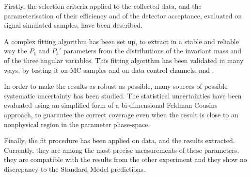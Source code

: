 Firstly, the selection criteria applied to the collected data, and the parameterisation of their efficiency and of the detector acceptance, evaluated on signal simulated samples, have been described.

A complex fitting algorithm has been set up, to extract in a stable and reliable way the $P_1$ and $P_5'$ parameters from the distributions of the \PKp\Pgpm\Pgmp\Pgmm invariant mass and of the three angular variables.
This fitting algorithm has been validated in many ways, by testing it on MC samples and on data control channels, \BtoKstJpsimumu and \BtoKstpsipmumu.

In order to make the results as robust as possible, many sources of possible systematic uncertainty has been studied.
The statistical uncertainties have been evaluated using an simplified form of a bi-dimensional Feldman-Cousins approach, to guarantee the correct coverage even when the result is close to an nonphysical region in the parameter phase-space.

Finally, the fit procedure has been applied on data, and the results extracted.
Currently, they are among the most precise measurements of these parameters, they are compatible with the results from the other experiment and they show no discrepancy to the Standard Model predictions.
